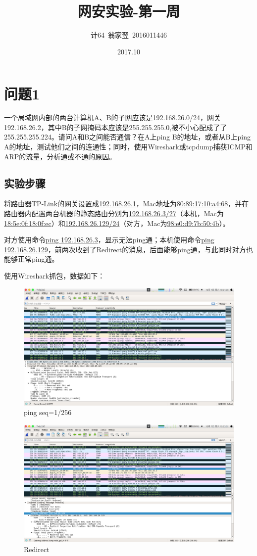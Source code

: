 \documentclass[a4paper]{article}
\title{\bf 网安实验-第一周}
\date{2017.10}
\author{计64~翁家翌~2016011446}
\begin{document}
\kaishu
\ttfamily
\maketitle
\section{问题1}
一个局域网内部的两台计算机A、B的子网应该是192.168.26.0/24，网关192.168.26.2，其中B的子网掩码本应该是255.255.255.0,被不小心配成了了255.255.255.224。请问A和B之间能否通信？在A上ping B的地址，或者从B上ping A的地址，测试他们之间的连通性；同时，使用Wireshark或tcpdump捕获ICMP和ARP的流量，分析通或不通的原因。
\subsection{实验步骤}
将路由器TP-Link的网关设置成\uline{192.168.26.1}，Mac地址为\uline{80:89:17:10:a4:68}，并在路由器内配置两台机器的静态路由分别为\uline{192.168.26.3/27}（本机，Mac为\uline{18:5e:0f:18:0f:ec}）和\uline{192.168.26.129/24}（对方，Mac为\uline{98:e0:d9:7b:50:4b}）。

对方使用命令\uline{ping 192.168.26.3}，显示无法ping通；本机使用命令\uline{ping 192.168.26.129}，前两次收到了Redirect的消息，后面能够ping通，与此同时对方也能够正常ping通。

使用Wireshark抓包，数据如下：
\begin{figure}[htp]
\centering
\includegraphics[width=1.0\linewidth]{tplink-mac.png}
\caption{ping seq=1/256}
\label{fig:1}
\end{figure}

\begin{figure}[htp]
\centering
\includegraphics[width=1.0\linewidth]{redirect.png}
\caption{Redirect}
\label{fig:2}
\end{figure}
\end{document}
